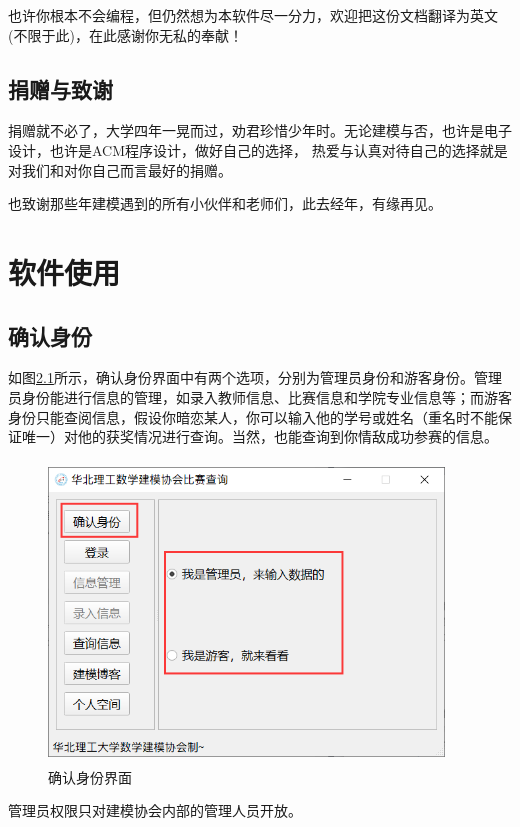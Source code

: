 \documentclass[cn,11pt,chinese, hazy]{elegantbook}
\begin{document}
也许你根本不会编程，但仍然想为本软件尽一分力，欢迎把这份文档翻译为英文(不限于此)，在此感谢你无私的奉献！

\section{捐赠与致谢}

捐赠就不必了，大学四年一晃而过，劝君珍惜少年时。无论建模与否，也许是电子设计，也许是ACM程序设计，做好自己的选择，
热爱与认真对待自己的选择就是对我们和对你自己而言最好的捐赠。

也致谢那些年建模遇到的所有小伙伴和老师们，此去经年，有缘再见。

\chapter{软件使用}

\section{确认身份}

如图\ref{fig:verify}所示，确认身份界面中有两个选项，分别为管理员身份和游客身份。管理员身份能进行信息的管理，如录入教师信息、比赛信息和学院专业信息等；而游客身份只能查阅信息，假设你暗恋某人，你可以输入他的学号或姓名（重名时不能保证唯一）对他的获奖情况进行查询。当然，也能查询到你情敌成功参赛的信息。
\begin{figure}[h]
    \centering
    \includegraphics[width=10.5cm, height=8cm]{figure/2.png}
    \caption{确认身份界面}
    \label{fig:verify}
\end{figure}

\begin{remark}
管理员权限只对建模协会内部的管理人员开放。
\end{remark}
\end{document}

